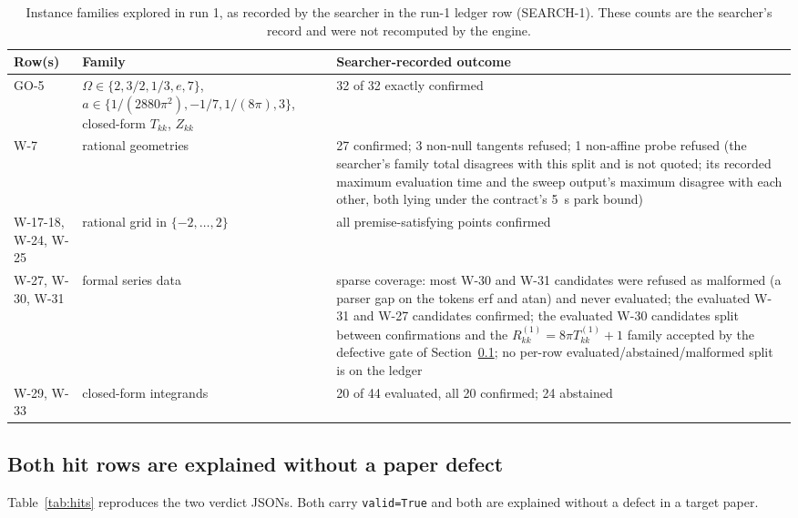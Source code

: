 \documentclass[11pt]{article}
\begin{document}
\begin{table}[t]
\centering
\caption{Instance families explored in run 1, as recorded by the searcher in the run-1 ledger row (SEARCH-1). These counts are the searcher's record and were not recomputed by the engine.}
\label{tab:families}
\small
\begin{tabular}{lll}
\toprule
Row(s) & Family & Searcher-recorded outcome \\
\midrule
GO-5 & $\Omega\in\{2,3/2,1/3,e,7\}$, $a\in\{1/(2880\pi^2),-1/7,1/(8\pi),3\}$, closed-form $T_{kk}$, $Z_{kk}$ & 32 of 32 exactly confirmed \\
W-7 & rational geometries & 27 confirmed; 3 non-null tangents refused; 1 non-affine probe refused (the searcher's family total disagrees with this split and is not quoted; its recorded maximum evaluation time and the sweep output's maximum disagree with each other, both lying under the contract's 5~s park bound) \\
W-17-18, W-24, W-25 & rational grid in $\{-2,\dots,2\}$ & all premise-satisfying points confirmed \\
W-27, W-30, W-31 & formal series data & sparse coverage: most W-30 and W-31 candidates were refused as malformed (a parser gap on the tokens erf and atan) and never evaluated; the evaluated W-31 and W-27 candidates confirmed; the evaluated W-30 candidates split between confirmations and the $R^{(1)}_{kk} = 8\pi T^{(1)}_{kk} + 1$ family accepted by the defective gate of Section~\ref{sec:hits}; no per-row evaluated/abstained/malformed split is on the ledger \\
W-29, W-33 & closed-form integrands & 20 of 44 evaluated, all 20 confirmed; 24 abstained \\
\bottomrule
\end{tabular}
\end{table}

\subsection{Both hit rows are explained without a paper defect}
\label{sec:hits}

Table~\ref{tab:hits} reproduces the two verdict JSONs. Both carry \texttt{valid=True} and both are explained without a defect in a target paper.
\end{document}
